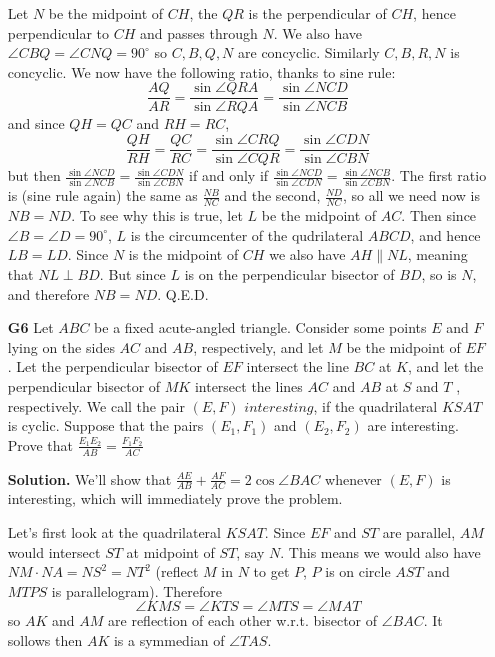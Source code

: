 \documentclass[11pt,a4paper]{article}
\begin{document}
\begin{enumerate}
	Let $N$ be the midpoint of $CH$, the $QR$ is the perpendicular of $CH$, hence perpendicular to $CH$ and passes through $N$. We also have $\angle CBQ=\angle CNQ = 90^{\circ}$ so $C, B, Q, N$ are concyclic. Similarly $C, B, R, N$ is concyclic. We now have the following ratio, thanks to sine rule: 
	\[
	\frac{AQ}{AR} = \frac{\sin\angle QRA}{\sin\angle RQA} = \frac{\sin\angle NCD}{\sin\angle NCB}
	\]
	and since $QH=QC$ and $RH=RC$, 
	\[
	\frac{QH}{RH} = \frac{QC}{RC} = \frac{\sin\angle CRQ}{\sin\angle CQR} = \frac{\sin\angle CDN}{\sin\angle CBN}
	\]
	but then $\frac{\sin\angle NCD}{\sin\angle NCB} = \frac{\sin\angle CDN}{\sin\angle CBN}$ if and only if $\frac{\sin\angle NCD}{\sin\angle CDN} = \frac{\sin\angle NCB}{\sin\angle CBN}$. The first ratio is (sine rule again) the same as $\frac{NB}{NC}$ and the second, $\frac{ND}{NC}$, so all we need now is $NB=ND$. 
	To see why this is true, let $L$ be the midpoint of $AC$. Then since $\angle B=\angle D=90^{\circ}$, $L$ is the circumcenter of the qudrilateral $ABCD$, and hence $LB=LD$. Since $N$ is the midpoint of $CH$ we also have $AH\parallel NL$, meaning that $NL\perp BD$. But since $L$ is on the perpendicular bisector of $BD$, so is $N$, and therefore $NB=ND$. Q.E.D. 
	
	\item[\textbf{G6}] Let $ABC$ be a fixed acute-angled triangle. Consider some points $E$ and $F$ lying on the sides $AC$ and $AB$, respectively, and let $M$ be the midpoint of $EF$ . Let the perpendicular bisector of $EF$ intersect the line $BC$ at $K$, and let the perpendicular bisector of $MK$ intersect the lines $AC$ and $AB$ at $S$ and $T$ , respectively. We call the pair $(E, F )$ $\textit{interesting}$, if the quadrilateral $KSAT$ is cyclic.
	Suppose that the pairs $(E_1 , F_1 )$ and $(E_2 , F_2 )$ are interesting. Prove that $\displaystyle\frac{E_1 E_2}{AB}=\frac{F_1 F_2}{AC}$
	
	\textbf{Solution.} 
	We'll show that $\frac{AE}{AB} + \frac{AF}{AC} = 2\cos\angle BAC$ whenever $(E, F)$ is interesting, which will immediately prove the problem. 
	
	Let's first look at the quadrilateral $KSAT$. 
	Since $EF$ and $ST$ are parallel, $AM$ would intersect $ST$ at midpoint of $ST$, say $N$. 
	This means we would also have $NM\cdot NA = NS^2=NT^2$ (reflect $M$ in $N$ to get $P$, $P$ is on circle $AST$ and $MTPS$ is parallelogram). 
	Therefore 
	\[
	\angle KMS = \angle KTS = \angle MTS = \angle MAT
	\]
	so $AK$ and $AM$ are reflection of each other w.r.t. bisector of $\angle BAC$. 
	It sollows then $AK$ is a symmedian of $\angle TAS$. 
	

\end{enumerate}
\end{document}

